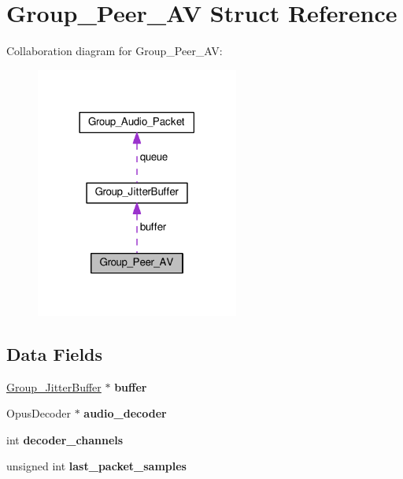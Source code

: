 \hypertarget{struct_group___peer___a_v}{\section{Group\+\_\+\+Peer\+\_\+\+A\+V Struct Reference}
\label{struct_group___peer___a_v}
}


Collaboration diagram for Group\+\_\+\+Peer\+\_\+\+A\+V\+:
\nopagebreak
\begin{figure}[H]
\begin{center}
\leavevmode
\includegraphics[width=189pt]{struct_group___peer___a_v__coll__graph}
\end{center}
\end{figure}
\subsection*{Data Fields}
\begin{DoxyCompactItemize}
\item 
\hypertarget{struct_group___peer___a_v_a6552b703c2e3958d1e030416f2893b27}{\hyperlink{struct_group___jitter_buffer}{Group\+\_\+\+Jitter\+Buffer} $\ast$ {\bfseries buffer}}\label{struct_group___peer___a_v_a6552b703c2e3958d1e030416f2893b27}

\item 
\hypertarget{struct_group___peer___a_v_a3b9ee5ac4c354a3e31a8acf7aa1a1b6c}{Opus\+Decoder $\ast$ {\bfseries audio\+\_\+decoder}}\label{struct_group___peer___a_v_a3b9ee5ac4c354a3e31a8acf7aa1a1b6c}

\item 
\hypertarget{struct_group___peer___a_v_afe1ef0788c8c4a05e136d1b00245138e}{int {\bfseries decoder\+\_\+channels}}\label{struct_group___peer___a_v_afe1ef0788c8c4a05e136d1b00245138e}

\item 
\hypertarget{struct_group___peer___a_v_af679faefa170266e24bc2af9b5a0161e}{unsigned int {\bfseries last\+\_\+packet\+\_\+samples}}\label{struct_group___peer___a_v_af679faefa170266e24bc2af9b5a0161e}

\end{DoxyCompactItemize}


